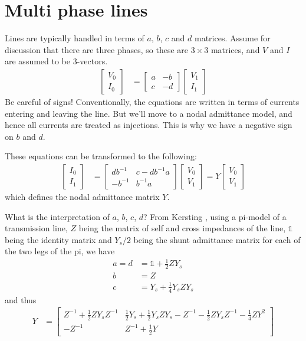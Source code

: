 \documentclass[11pt]{article}
\newcommand{\Id}{\mathds{1}}
\begin{document}
\section{Multi phase lines}
Lines are typically handled in terms of $a$, $b$, $c$ and $d$ matrices. Assume for discussion that there are three phases, so these are $3 \times 3$ matrices, and $V$ and $I$ are assumed to be 3-vectors.
\begin{align}
	\begin{bmatrix} V_0 \\ I_0 \end{bmatrix} &=
	\begin{bmatrix} a & -b \\ c & -d \end{bmatrix} \begin{bmatrix} V_1 \\ I_1 \end{bmatrix}
\end{align}
Be careful of signs! Conventionally, the equations are written in terms of currents entering and leaving the line. But we'll move to a nodal admittance model, and hence all currents are treated as injections. This is why we have a negative sign on $b$ and $d$.

These equations can be transformed to the following:
\begin{align}
	\begin{bmatrix} I_0 \\ I_1 \end{bmatrix} &=
	\begin{bmatrix} db^{-1} & c - db^{-1}a \\ -b^{-1} & b^{-1}a \end{bmatrix} \begin{bmatrix} V_0 \\ V_1 \end{bmatrix} = Y\begin{bmatrix} V_0 \\ V_1 \end{bmatrix} 
\end{align}
which defines the nodal admittance matrix $Y$.

What is the interpretation of $a$, $b$, $c$, $d$? From Kersting \cite{KerstingXXXXa}, using a pi-model of a transmission line, $Z$ being the matrix of self and cross impedances of the line, $\Id$ being the identity matrix and $Y_s/2$ being the shunt admittance matrix for each of the two legs of the pi, we have
\begin{align}
a = d &= \Id + \frac{1}{2}ZY_s \\
b &= Z \\
c &= Y_s + \frac{1}{4}Y_s Z Y_s
\end{align}
and thus
\begin{align}
Y &= \begin{bmatrix} Z^{-1} + \frac{1}{2}ZY_sZ^{-1} & \frac{1}{2}Y_s + \frac{1}{2}Y_sZY_s - Z^{-1}-\frac{1}{2}ZY_sZ^{-1}-\frac{1}{4}ZY^2 \\
-Z^{-1} & Z^{-1}+\frac{1}{2}Y \end{bmatrix} 
\end{align}
\end{document}
